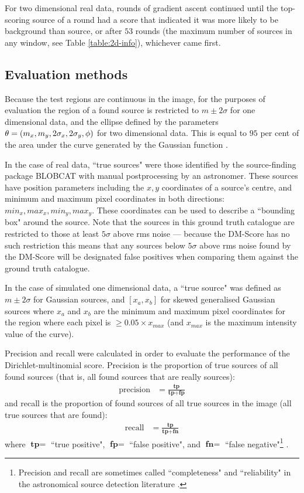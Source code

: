 For two dimensional real data, rounds of gradient ascent continued until the top-scoring source of a round had a score that indicated it was more likely to be background than source, or after $53$ rounds (the maximum number of sources in any window, see Table \ref{table:2d-info}), whichever came first.

\subsection{Evaluation methods}
Because the test regions are continuous in the image, for the purposes of evaluation the region of a found source is restricted to $m \pm 2\sigma$ for one dimensional data, and the ellipse defined by the parameters $\theta = (m_x, m_y, \\2\sigma_x, 2\sigma_y, \phi)$ for two dimensional data. This is equal to $95$ per cent of the area under the curve generated by the Gaussian function \cite{wasserman2004all}.

In the case of real data, ``true sources" were those identified by the source-finding package BLOBCAT \cite{hales2012blobcat} with manual postprocessing by an astronomer. These sources have position parameters including the $x,y$ coordinates of a source's centre, and minimum and maximum pixel coordinates in both directions: $min_x, max_x, min_y, max_y$. These coordinates can be used to describe a ``bounding box" around the source. Note that the sources in this ground truth catalogue are restricted to those at least $5 \sigma$ above rms noise --- because the DM-Score has no such restriction this means that any sources below $5 \sigma$ above rms noise found by the DM-Score will be designated false positives when comparing them against the ground truth catalogue.

In the case of simulated one dimensional data, a ``true source" was defined as  $m \pm 2\sigma$ for Gaussian sources, and $[x_a,x_b]$ for skewed generalised Gaussian sources where $x_a$ and $x_b$ are the minimum and maximum pixel coordinates for the region where each pixel is $\ge 0.05 \times x_{max}$ (and $x_{max}$ is the maximum intensity value of the curve).

Precision and recall were calculated in order to evaluate the performance of the Dirichlet-multinomial score. Precision is the proportion of true sources of all found sources (that is, all found sources that are really sources):
\begin{align}
\text{precision} &= \frac{\textbf{tp}}{\textbf{tp}+\textbf{fp}}
\end{align}
and recall is the proportion of found sources of all true sources in the image (all true sources that are found):
\begin{align}
\text{recall} &= \frac{\textbf{tp}}{\textbf{tp}+\textbf{fn}}
\end{align}
where $\textbf{tp} =$ ``true positive", $\textbf{fp} =$  ``false positive", and $\textbf{fn} =$ ``false negative"\footnote{Precision and recall are sometimes called ``completeness" and ``reliability" in the astronomical source detection literature \cite{hancock2012compact}.} \cite{olson2008advanced}.

